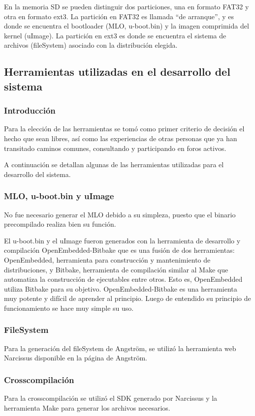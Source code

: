 \documentclass[%
        final,
        notitlepage,
        narroweqnarray,
        inline,
        ]{ieee}
\begin{document}
En la memoria SD se pueden distinguir dos particiones, una en formato FAT32 y otra
en formato ext3. La partición en FAT32 es llamada “de arranque”, y es donde se encuentra 
el bootloader (MLO, u-boot.bin) y la imagen comprimida del kernel (uImage). 
La partición en ext3 es donde se encuentra el sistema de archivos (fileSystem) asociado con la distribución elegida.


\subsection{Herramientas utilizadas en el desarrollo del sistema}

\subsubsection{Introducción}
Para la elección de las herramientas se tomó como primer criterio de decisión el hecho que sean libres, así como las experiencias de otras personas que ya han transitado caminos comunes, consultando y participando en foros activos.


A continuación se detallan algunas de las herramientas utilizadas para el desarrollo del sistema. 

\subsubsection{MLO, u-boot.bin y uImage}
No fue necesario generar el MLO debido a su simpleza, puesto que el binario precompilado realiza bien su función.

El u-boot.bin y el uImage fueron generados con la herramienta de desarrollo y compilación OpenEmbedded-Bitbake que es una fusión de dos herramientas: OpenEmbedded, herramienta para construcción y mantenimiento de distribuciones, y Bitbake, herramienta de compilación similar al Make que automatiza la construcción de ejecutables entre otros. Esto es, OpenEmbedded utiliza Bitbake para su objetivo. OpenEmbedded-Bitbake es una herramienta muy potente y difícil de aprender al principio. Luego de entendido su principio de funcionamiento se hace muy simple su uso.


\subsubsection{FileSystem}
Para la generación del fileSystem de Angström, se utilizó la herramienta web Narcissus disponible en la página de Angström.


\subsubsection{Crosscompilación}
Para la crosscompilación se utilizó el SDK generado por Narcissus y la herramienta Make para generar los archivos necesarios.
\end{document}

